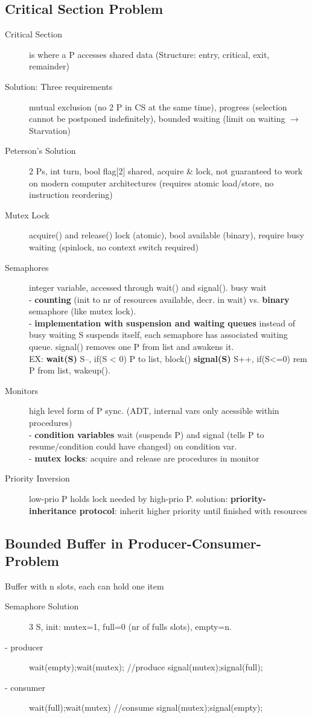 \subsection*{Critical Section Problem}
\begin{description}
    \item[Critical Section]is where a P accesses shared data (Structure: entry, critical, exit, remainder)
    \item[Solution: Three requirements] mutual exclusion (no 2 P in CS at the same time), progress (selection cannot be postponed indefinitely), bounded waiting (limit on waiting $\rightarrow$ Starvation)
    \item[Peterson's Solution]2 Ps, int turn, bool flag[2] shared, acquire \& lock, not guaranteed to work on modern computer architectures (requires atomic load/store, no instruction reordering)
    \item[Mutex Lock] acquire() and release() lock (atomic), bool available (binary), require busy waiting (spinlock, no context switch required)
    \item[Semaphores] integer variable, accessed through wait() and signal(). busy wait \\
        - \textbf{counting} (init to nr of resources available, decr. in wait) vs. \textbf{binary} semaphore (like mutex lock). \\
        -  \textbf{implementation with suspension and waiting queues} instead of busy waiting S suspends itself, each semaphore has associated waiting queue. signal() removes one P from list and awakens it. \\
        EX: \textbf{wait(S)} S--, if(S < 0) P to list, block() \textbf{signal(S)} S++, if(S<=0) rem P from list, wakeup().
    \item[Monitors] high level form of P sync. (ADT, internal vars only acessible within procedures) \\
        - \textbf{condition variables} wait (suspends P) and signal (tells P to resume/condition could have changed) on condition var. \\
        - \textbf{mutex locks}: acquire and release are procedures in monitor
    \item[Priority Inversion] low-prio P holds lock needed by high-prio P. solution: \textbf{priority-inheritance protocol}: inherit higher priority until finished with resources
\end{description}

\subsection*{Bounded Buffer in Producer-Consumer-Problem}
Buffer with n slots, each can hold one item
\begin{description}
    \item[Semaphore Solution]3 S, init: mutex=1, full=0 (nr of fulls slots), empty=n.
    \item[- producer]wait(empty);wait(mutex); //produce signal(mutex);signal(full);
    \item[- consumer]wait(full);wait(mutex) //consume signal(mutex);signal(empty);
\end{description}

